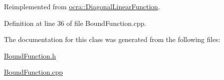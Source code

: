 Reimplemented from \hyperlink{classocra_1_1DiagonalLinearFunction_a0673bfe405d5637182c4749dd2737e95}{ocra\+::\+Diagonal\+Linear\+Function}.



Definition at line 36 of file Bound\+Function.\+cpp.



The documentation for this class was generated from the following files\+:\begin{DoxyCompactItemize}
\item 
\hyperlink{BoundFunction_8h}{Bound\+Function.\+h}\item 
\hyperlink{BoundFunction_8cpp}{Bound\+Function.\+cpp}\end{DoxyCompactItemize}
